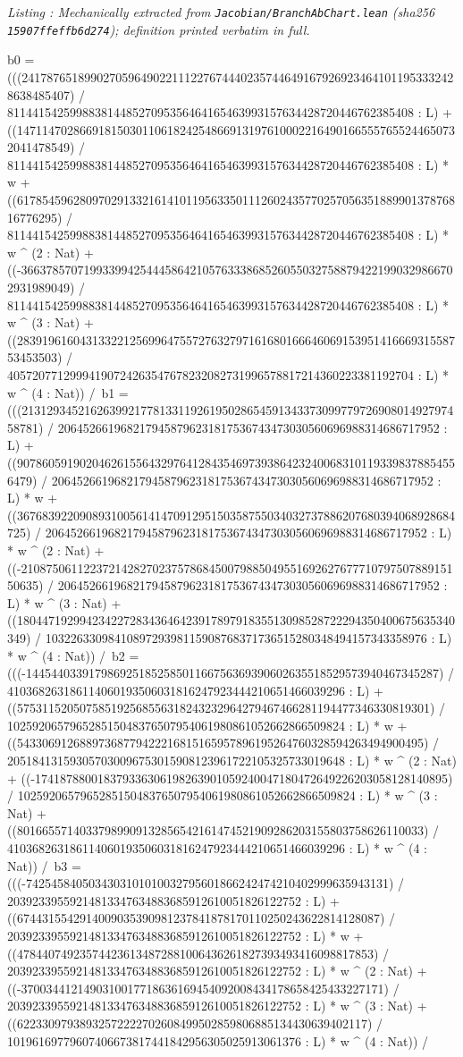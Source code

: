 \documentclass[a4paper,11pt]{article}
\newcounter{leanlisting}
\newenvironment{leanlisting}[2]{%
  \refstepcounter{leanlisting}\label{#2}%
  \begin{center}\textit{\small\color{inksecondary}Listing \theleanlisting: #1}\end{center}%
  \Verbatim[breaklines=true,breakanywhere=true,fontsize=\footnotesize,frame=single,framesep=4pt,rulecolor=\color{borderstrong},fillcolor=\color{bgsubtle}]%
}{%
  \endVerbatim%
}
\theoremstyle{jsplain}
\theoremstyle{jsdef}
\theoremstyle{jsrem}
\begin{document}
\begin{leanlisting}{Mechanically extracted from \texttt{Jacobian/BranchAbChart.lean} (sha256 \texttt{15907ffeffb6d274}); definition printed verbatim in full.}{ab:lst:def-chartclass}
      b0 = (((2417876518990270596490221112276744402357446491679269234641011953332428638485407) / 81144154259988381448527095356464165463993157634428720446762385408 : L) + ((14711470286691815030110618242548669131976100022164901665557655244650732041478549) / 81144154259988381448527095356464165463993157634428720446762385408 : L) * w + ((617854596280970291332161410119563350111260243577025705635188990137876816776295) / 81144154259988381448527095356464165463993157634428720446762385408 : L) * w ^ (2 : Nat) + ((-3663785707199339942544458642105763338685260550327588794221990329866702931989049) / 81144154259988381448527095356464165463993157634428720446762385408 : L) * w ^ (3 : Nat) + ((283919616043133221256996475572763279716168016664606915395141666931558753453503) / 40572077129994190724263547678232082731996578817214360223381192704 : L) * w ^ (4 : Nat)) /\
      b1 = (((21312934521626399217781331192619502865459134337309977972690801492797458781) / 2064526619682179458796231817536743473030560696988314686717952 : L) + ((90786059190204626155643297641284354697393864232400683101193398378854556479) / 2064526619682179458796231817536743473030560696988314686717952 : L) * w + ((3676839220908931005614147091295150358755034032737886207680394068928684725) / 2064526619682179458796231817536743473030560696988314686717952 : L) * w ^ (2 : Nat) + ((-21087506112237214282702375786845007988504955169262767771079750788915150635) / 2064526619682179458796231817536743473030560696988314686717952 : L) * w ^ (3 : Nat) + ((1804471929942342272834364642391789791835513098528722294350400675635340349) / 1032263309841089729398115908768371736515280348494157343358976 : L) * w ^ (4 : Nat)) /\
      b2 = (((-144544033917986925185258501166756369390602635518529573940467345287) / 410368263186114060193506031816247923444210651466039296 : L) + ((575311520507585192568556318243232964279467466281194477346330819301) / 102592065796528515048376507954061980861052662866509824 : L) * w + ((54330691268897368779422216815165957896195264760328594263494900495) / 205184131593057030096753015908123961722105325733019648 : L) * w ^ (2 : Nat) + ((-174187880018379336306198263901059240047180472649226203058128140895) / 102592065796528515048376507954061980861052662866509824 : L) * w ^ (3 : Nat) + ((80166557140337989909132856542161474521909286203155803758626110033) / 410368263186114060193506031816247923444210651466039296 : L) * w ^ (4 : Nat)) /\
      b3 = (((-7425458405034303101010032795601866242474210402999635943131) / 20392339559214813347634883685912610051826122752 : L) + ((6744315542914009035390981237841878170110250243622814128087) / 20392339559214813347634883685912610051826122752 : L) * w + ((478440749235744236134872881006436261827393493416098817853) / 20392339559214813347634883685912610051826122752 : L) * w ^ (2 : Nat) + ((-3700344121490310017718636169454092008434178658425433227171) / 20392339559214813347634883685912610051826122752 : L) * w ^ (3 : Nat) + ((62233097938932572222702608499502859806885134430639402117) / 10196169779607406673817441842956305025913061376 : L) * w ^ (4 : Nat)) /\

\end{leanlisting}
\end{document}
